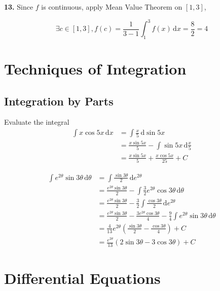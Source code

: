 \documentclass[a4paper,12pt]{article}
\newcommand{\ud}{\,\mathrm{d}}
\begin{document}
\noindent\textbf{13. }Since $f$ is continuous, apply Mean Value Theorem on
$[1, 3]$,

\[\exists c \in [1, 3], f(c) = \frac{1}{3 - 1}\int_1^3 f(x)\ud x
= \frac{8}{2} = 4\]

\section{Techniques of Integration}
\subsection{Integration by Parts}
Evaluate the integral
\begin{align*}
   \int x \cos 5x \ud x
&= \int\frac{x}{5} \ud\sin 5x\\
&= \frac{x\sin 5x}{5} - \int\sin 5x \ud\frac{x}{5}\\
&= \frac{x\sin 5x}{5} + \frac{x\cos 5x}{25} + C\tag{3}
\end{align*}

\begin{align*}
   \int e^{2\theta}\sin 3\theta \ud\theta
&= \int\frac{\sin 3\theta}{2} \ud e^{2\theta}\\
&= \frac{e^{2\theta}\sin 3\theta}{2}
 - \int\frac{3}{2}e^{2\theta}\cos 3\theta \ud\theta\\
&= \frac{e^{2\theta}\sin 3\theta}{2}
 - \frac{3}{2}\int\frac{\cos 3\theta}{2} \ud e^{2\theta}\\
&= \frac{e^{2\theta}\sin 3\theta}{2}
 - \frac{3e^{2\theta}\cos 3\theta}{4}
 - \frac{9}{4}\int e^{2\theta}\sin 3\theta \ud\theta\\
&= \frac{4}{13}e^{2\theta}
   \left(\frac{\sin 3\theta}{2} - \frac{\cos 3\theta}{4}\right) + C\\
&= \frac{e^{2\theta}}{13}(2\sin 3\theta - 3\cos 3\theta) + C\tag{17}
\end{align*}

\setcounter{section}{8}
\section{Differential Equations}
\setcounter{subsection}{2}
\end{document}
